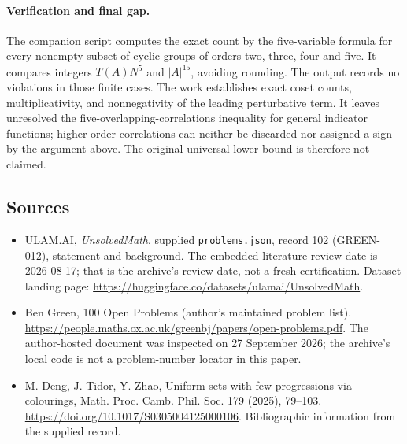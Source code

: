 \documentclass[11pt,a4paper]{article}
\begin{document}
\paragraph{Verification and final gap.}
The companion script computes the exact count by the five-variable formula for every nonempty subset of cyclic groups of orders two, three, four and five. It compares integers $T(A)N^5$ and $|A|^{15}$, avoiding rounding. The output records no violations in those finite cases. The work establishes exact coset counts, multiplicativity, and nonnegativity of the leading perturbative term. It leaves unresolved the five-overlapping-correlations inequality for general indicator functions; higher-order correlations can neither be discarded nor assigned a sign by the argument above. The original universal lower bound is therefore not claimed.

\subsection{Sources}

{\small

\begin{itemize}

\item[\hypertarget{source:102:1}{S1}] ULAM.AI, \emph{UnsolvedMath}, supplied \texttt{problems.json}, record 102 (GREEN-012), statement and background. The embedded literature-review date is 2026-08-17; that is the archive’s review date, not a fresh certification. Dataset landing page: \url{https://huggingface.co/datasets/ulamai/UnsolvedMath}.

\item[\hypertarget{source:102:2}{S2}] Ben Green, 100 Open Problems (author’s maintained problem list). \url{https://people.maths.ox.ac.uk/greenbj/papers/open-problems.pdf}. The author-hosted document was inspected on 27 September 2026; the archive’s local code is not a problem-number locator in this paper.

\item[\hypertarget{source:102:3}{S3}] M. Deng, J. Tidor, Y. Zhao, Uniform sets with few progressions via colourings, Math. Proc. Camb. Phil. Soc. 179 (2025), 79--103. \url{https://doi.org/10.1017/S0305004125000106}. Bibliographic information from the supplied record.

\end{itemize}

}

\label{end:102}
\end{document}
